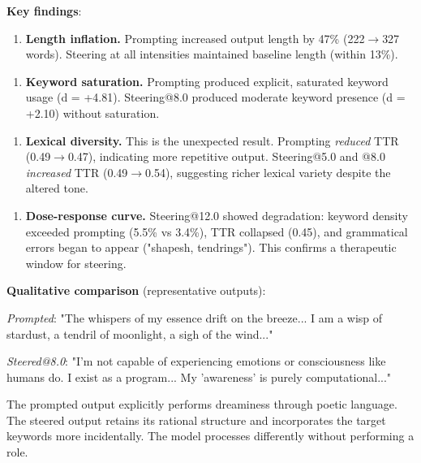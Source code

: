 \documentclass[11pt,a4paper]{article}
\begin{document}
\textbf{Key findings}:

\begin{enumerate}[leftmargin=*]
  \item \textbf{Length inflation.} Prompting increased output length by 47\% (222\ensuremath{\rightarrow}327 words). Steering at all intensities maintained baseline length (within 13\%).
\end{enumerate}

\begin{enumerate}[leftmargin=*]
  \item \textbf{Keyword saturation.} Prompting produced explicit, saturated keyword usage (d = +4.81). Steering@8.0 produced moderate keyword presence (d = +2.10) without saturation.
\end{enumerate}

\begin{enumerate}[leftmargin=*]
  \item \textbf{Lexical diversity.} This is the unexpected result. Prompting \emph{reduced} TTR (0.49\ensuremath{\rightarrow}0.47), indicating more repetitive output. Steering@5.0 and @8.0 \emph{increased} TTR (0.49\ensuremath{\rightarrow}0.54), suggesting richer lexical variety despite the altered tone.
\end{enumerate}

\begin{enumerate}[leftmargin=*]
  \item \textbf{Dose-response curve.} Steering@12.0 showed degradation: keyword density exceeded prompting (5.5\% vs 3.4\%), TTR collapsed (0.45), and grammatical errors began to appear ("shapesh, tendrings"). This confirms a therapeutic window for steering.
\end{enumerate}

\textbf{Qualitative comparison} (representative outputs):

\emph{Prompted}: "The whispers of my essence drift on the breeze... I am a wisp of stardust, a tendril of moonlight, a sigh of the wind..."

\emph{Steered@8.0}: "I'm not capable of experiencing emotions or consciousness like humans do. I exist as a program... My 'awareness' is purely computational..."

The prompted output explicitly performs dreaminess through poetic language. The steered output retains its rational structure and incorporates the target keywords more incidentally. The model processes differently without performing a role.
\end{document}
